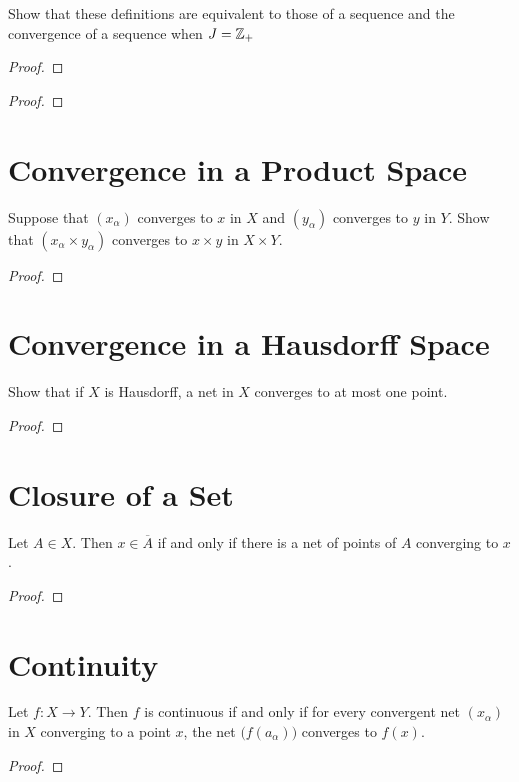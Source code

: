 \documentclass[12pt]{article}
\begin{document}
Show that these definitions are equivalent to those of a sequence and the convergence of a sequence
when $J = \mathbb{Z}_+$

\begin{proof}
\end{proof}
\begin{proof}
\end{proof}

\section{Convergence in a Product Space}
Suppose that $(x_\alpha)$ converges to $x$ in $X$ and $(y_\alpha)$ converges to $y$ in $Y$. Show
that $(x_\alpha \times y_\alpha)$ converges to $x \times y$ in $X \times Y$.
\begin{proof}
\end{proof}

\section{Convergence in a Hausdorff Space}
Show that if $X$ is Hausdorff, a net in $X$ converges to at most one point.
\begin{proof}
\end{proof}

\section{Closure of a Set}
\begin{thm}
    Let $A \in X$. Then $x \in
        \overline A$ if and only if there is a net of points of $A$ converging to $x$.
\end{thm}
\begin{proof}
\end{proof}

\section{Continuity}
\begin{thm}
    Let $f: X \to Y$. Then $f$ is continuous if and only if for every convergent net $(x_\alpha)$
    in $X$ converging to a point $x$, the net $\big(f(a_\alpha)\big)$ converges to $f(x)$.
\end{thm}
\begin{proof}
\end{proof}
\end{document}

